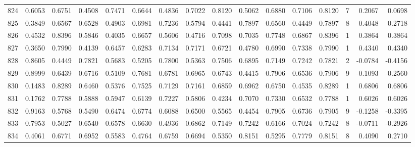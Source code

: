 \begin{tabular}{lrrrrrrrrrrrrrrr}
824 &      0.6053 &  0.6751 &  0.4508 &  0.7471 &  0.6644 &  0.4836 &  0.7022 &  0.8120 &  0.5062 &  0.6880 &   0.7106 &     0.8120 &      7 &                    0.2067 &                     0.0698 \\
825 &      0.3849 &  0.6567 &  0.6528 &  0.4903 &  0.6981 &  0.7236 &  0.5794 &  0.4441 &  0.7897 &  0.6560 &   0.4449 &     0.7897 &      8 &                    0.4048 &                     0.2718 \\
826 &      0.4532 &  0.8396 &  0.5846 &  0.4035 &  0.6657 &  0.5606 &  0.4716 &  0.7098 &  0.7035 &  0.7748 &   0.6867 &     0.8396 &      1 &                    0.3864 &                     0.3864 \\
827 &      0.3650 &  0.7990 &  0.4139 &  0.6457 &  0.6283 &  0.7134 &  0.7171 &  0.6721 &  0.4780 &  0.6990 &   0.7338 &     0.7990 &      1 &                    0.4340 &                     0.4340 \\
828 &      0.8605 &  0.4449 &  0.7821 &  0.5683 &  0.5205 &  0.7800 &  0.5363 &  0.7506 &  0.6895 &  0.7149 &   0.7242 &     0.7821 &      2 &                   -0.0784 &                    -0.4156 \\
829 &      0.8999 &  0.6439 &  0.6716 &  0.5109 &  0.7681 &  0.6781 &  0.6965 &  0.6743 &  0.4415 &  0.7906 &   0.6536 &     0.7906 &      9 &                   -0.1093 &                    -0.2560 \\
830 &      0.1483 &  0.8289 &  0.6460 &  0.5376 &  0.7525 &  0.7129 &  0.7161 &  0.6859 &  0.6962 &  0.6750 &   0.4535 &     0.8289 &      1 &                    0.6806 &                     0.6806 \\
831 &      0.1762 &  0.7788 &  0.5888 &  0.5947 &  0.6139 &  0.7227 &  0.5806 &  0.4234 &  0.7070 &  0.7330 &   0.6532 &     0.7788 &      1 &                    0.6026 &                     0.6026 \\
832 &      0.9163 &  0.5768 &  0.5490 &  0.6474 &  0.6774 &  0.6088 &  0.6500 &  0.5565 &  0.4454 &  0.7905 &   0.6736 &     0.7905 &      9 &                   -0.1258 &                    -0.3395 \\
833 &      0.7953 &  0.5027 &  0.6540 &  0.6578 &  0.6630 &  0.4936 &  0.6862 &  0.7149 &  0.7242 &  0.6166 &   0.7024 &     0.7242 &      8 &                   -0.0711 &                    -0.2926 \\
834 &      0.4061 &  0.6771 &  0.6952 &  0.5583 &  0.4764 &  0.6759 &  0.6694 &  0.5350 &  0.8151 &  0.5295 &   0.7779 &     0.8151 &      8 &                    0.4090 &                     0.2710 \\

\end{tabular}
